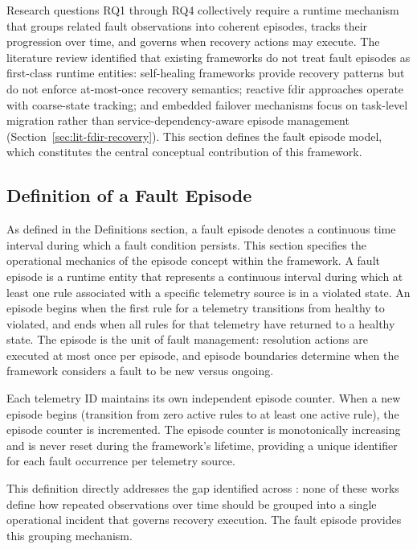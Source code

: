 Research questions RQ1 through RQ4 collectively require a runtime mechanism that groups related fault observations into coherent episodes, tracks their progression over time, and governs when recovery actions may execute. The literature review identified that existing frameworks do not treat fault episodes as first-class runtime entities: self-healing frameworks \cite{ref17,ref19,ref21} provide recovery patterns but do not enforce at-most-once recovery semantics; reactive \gls{fdir} approaches \cite{ref20} operate with coarse-state tracking; and embedded failover mechanisms \cite{ref23,ref24,ref25} focus on task-level migration rather than service-dependency-aware episode management (Section~\ref{sec:lit-fdir-recovery}). This section defines the fault episode model, which constitutes the central conceptual contribution of this framework.

\subsection{Definition of a Fault Episode}\label{sec:episode-definition}

As defined in the Definitions section, a fault episode denotes a continuous time interval during which a fault condition persists. This section specifies the operational mechanics of the episode concept within the framework. A fault episode is a runtime entity that represents a continuous interval during which at least one rule associated with a specific telemetry source is in a violated state. An episode begins when the first rule for a telemetry transitions from healthy to violated, and ends when all rules for that telemetry have returned to a healthy state. The episode is the unit of fault management: resolution actions are executed at most once per episode, and episode boundaries determine when the framework considers a fault to be new versus ongoing.

Each telemetry ID maintains its own independent episode counter. When a new episode begins (transition from zero active rules to at least one active rule), the episode counter is incremented. The episode counter is monotonically increasing and is never reset during the framework's lifetime, providing a unique identifier for each fault occurrence per telemetry source.

This definition directly addresses the gap identified across \cite{ref1,ref3,ref5,ref17,ref19,ref20,ref26}: none of these works define how repeated observations over time should be grouped into a single operational incident that governs recovery execution. The fault episode provides this grouping mechanism.

